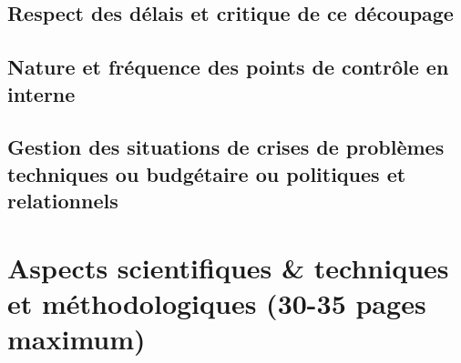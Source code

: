 \documentclass[a4paper, 12pt]{article}
\begin{document}
    
    \newpage{}
    
\subsection{Respect des délais et critique de ce découpage}


    
    \newpage{}
    
\subsection{Nature et fréquence des points de contrôle en interne}


    
    \newpage{}
    
\subsection{Gestion des situations de crises de problèmes techniques ou budgétaire ou politiques et relationnels}


    
    \newpage{}
    
\newpage{}
\section{Aspects scientifiques \& techniques et méthodologiques (30-35 pages maximum)}
\end{document}
